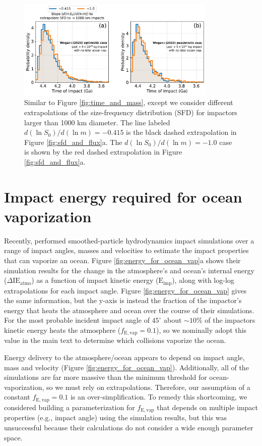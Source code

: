 \documentclass{aastex631}
\begin{document}
\begin{figure}
  \centering
  \includegraphics[width=0.85\textwidth]{figures/timing_extrapolation_sensitivity.pdf}
  \caption{Similar to Figure \ref{fig:time_and_mass}, except we consider different extrapolations of the size-frequency distribution (SFD) for impactors larger than 1000 km diameter. The line labeled $d (\ln S_0)/d (\ln m) = - 0.415$ is the black dashed extrapolation in Figure \ref{fig:sfd_and_flux}a. The $d (\ln S_0)/d (\ln m) = - 1.0$ case is shown by the red dashed extrapolation in Figure \ref{fig:sfd_and_flux}a.}
  \label{fig:timing_extrapolation_sensitivity}
\end{figure}

\section{Impact energy required for ocean vaporization} \label{sec:append_vap}

Recently, \citet{Citron_2022} performed smoothed-particle hydrodynamics impact simulations over a range of impact angles, masses and velocities to estimate the impact properties that can vaporize an ocean. Figure \ref{fig:energy_for_ocean_vap}a shows their simulation results for the change in the atmosphere's and ocean's internal energy ($\Delta \mathrm{IE}_\mathrm{atmo}$) as a function of impact kinetic energy ($\mathrm{E}_\mathrm{imp}$), along with log-log extrapolations for each impact angle. Figure \ref{fig:energy_for_ocean_vap} gives the same information, but the y-axis is instead the fraction of the impactor's energy that heats the atmosphere and ocean over the course of their simulations. For the most probable incident impact angle of $45^\circ$ about $\sim 10\%$ of the impactors kinetic energy heats the atmosphere ($f_\mathrm{E,vap} = 0.1$), so we nominally adopt this value in the main text to determine which collisions vaporize the ocean.

Energy delivery to the atmosphere/ocean appears to depend on impact angle, mass and velocity (Figure \ref{fig:energy_for_ocean_vap}). Additionally, all of the \citet{Citron_2022} simulations are far more massive than the minimum threshold for ocean-vaporization, so we must rely on extrapolations. Therefore, our assumption of a constant $f_\mathrm{E,vap} = 0.1$ is an over-simplification. To remedy this shortcoming, we considered building a parameterization for $f_\mathrm{E,vap}$ that depends on multiple impact properties (e.g., impact angle) using the \citet{Citron_2022} simulation results, but this was unsuccessful because their calculations do not consider a wide enough parameter space.
\end{document}
